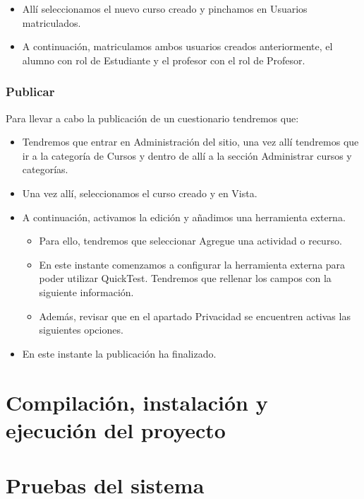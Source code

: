 \begin{itemize}
	\item Allí seleccionamos el nuevo curso creado y pinchamos en Usuarios matriculados.
	
	\item A continuación, matriculamos ambos usuarios creados anteriormente, el alumno con rol de Estudiante y el profesor con el rol de Profesor.
	
	

\end{itemize}

\subsubsection{Publicar}

Para llevar a cabo la publicación de un cuestionario tendremos que:

\begin{itemize}

	\item Tendremos que entrar en Administración del sitio, una vez allí tendremos que ir a la categoría de Cursos y dentro de allí a la sección Administrar cursos y categorías.
	
	\item Una vez allí, seleccionamos el curso creado y en Vista.
	
	\item A continuación, activamos la edición y añadimos una herramienta externa.
	
	\begin{itemize}
	
			\item Para ello, tendremos que seleccionar Agregue una actividad o recurso. 
			\item En este instante comenzamos a configurar la herramienta externa para poder utilizar QuickTest. Tendremos que rellenar los campos con la siguiente información. 
			
			\item Además, revisar que en el apartado Privacidad se encuentren activas las siguientes opciones. 
	
	\end{itemize}
	
	\item En este instante la publicación ha finalizado.

\end{itemize}







\section{Compilación, instalación y ejecución del proyecto}

\section{Pruebas del sistema}

